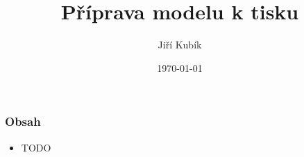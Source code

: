 \documentclass[aspectratio=169]{beamer}
\author{Jiří Kubík}
\title{Příprava modelu k tisku}
\date{\today}
\institute{%
\vspace{0.25em}
   {\bf \ps}\\ 
\vspace{0.25em}
   {\bf 2022}\\ 
\vspace{0.25em}
   {\GyBot}\\
\vspace{0.25em}
   {rev. 2022-10-1}
}
\begin{document}
    \begin{frame}
        \titlepage
    \end{frame}

    \begin{frame}[t]
        \frametitle{Obsah}
        \begin{itemize}
            \item TODO
        \end{itemize}
    \end{frame}

    
    
    
\end{document}
